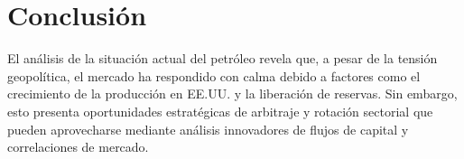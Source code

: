 \documentclass{article}
\begin{document}
\section{Conclusión}
El análisis de la situación actual del petróleo revela que, a pesar de la tensión geopolítica, el mercado ha respondido con calma debido a factores como el crecimiento de la producción en EE.UU. y la liberación de reservas. Sin embargo, esto presenta oportunidades estratégicas de arbitraje y rotación sectorial que pueden aprovecharse mediante análisis innovadores de flujos de capital y correlaciones de mercado.
\end{document}
